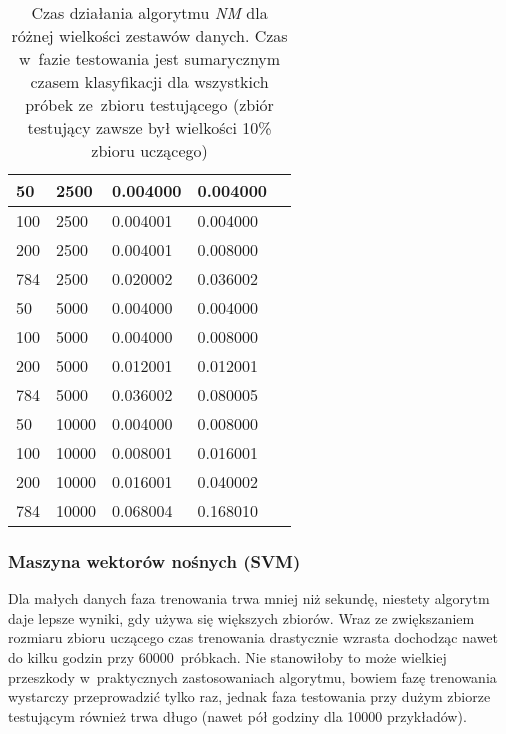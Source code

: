 \documentclass[12pt]{article}
\begin{document}
\begin{table}[H]
\begin{center}
\begin{tabular}[H]{|l|l|l|l|l|}
			  50 &2500 & 0.004000 &0.004000 \\ \hline 
			  100& 2500 & 0.004001 &0.004000\\ \hline 
			  200 &2500 & 0.004001 &0.008000 \\ \hline 
			  784 &2500 & 0.020002 &0.036002 \\ \hline 
\hline
			  50 &5000 & 0.004000 &0.004000 \\ \hline 
			  100& 5000 & 0.004000 &0.008000 \\ \hline 
			  200 &5000 & 0.012001 &0.012001 \\ \hline  
			  784 &5000 & 0.036002 &0.080005 \\ \hline 
\hline
			  50 &10000 &0.004000 &0.008000\\ \hline 
			  100 &10000 & 0.008001& 0.016001 \\ \hline 
			  200 &10000 & 0.016001 &0.040002 \\ \hline 
			  784 &10000 & 0.068004 &0.168010 \\ \hline 
 \end{tabular} 
\end{center}
 \caption{Czas działania algorytmu \emph{NM} dla różnej wielkości zestawów danych. Czas w~fazie testowania jest sumarycznym czasem klasyfikacji dla wszystkich próbek ze~zbioru testującego (zbiór testujący zawsze był wielkości 10\% zbioru uczącego)} 
\label{tab: czas nm}
\end{table}

\subsubsection{Maszyna wektorów nośnych (SVM)}
Dla małych danych faza trenowania trwa mniej niż sekundę, niestety algorytm daje lepsze wyniki, gdy używa się większych zbiorów. Wraz ze zwiększaniem rozmiaru zbioru uczącego czas trenowania drastycznie wzrasta dochodząc nawet
do kilku godzin przy 60000~próbkach. Nie stanowiłoby to może wielkiej przeszkody w~praktycznych zastosowaniach algorytmu, bowiem fazę trenowania wystarczy przeprowadzić tylko raz, jednak faza testowania przy dużym zbiorze testującym
również trwa długo (nawet pół godziny dla 10000 przykładów).
\end{document}
